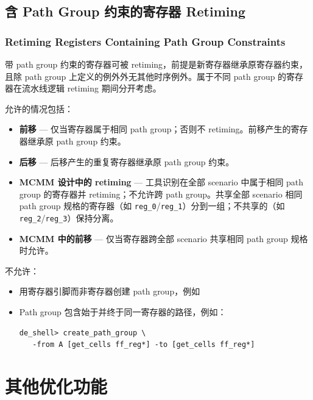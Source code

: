 
\subsection{含 Path Group 约束的寄存器 Retiming}
\subsubsection*{Retiming Registers Containing Path Group Constraints}

带 path group 约束的寄存器可被 retiming，前提是新寄存器继承原寄存器约束，且除 path group 上定义的例外外无其他时序例外。属于不同 path group 的寄存器在流水线逻辑 retiming 期间分开考虑。

允许的情况包括：
\begin{itemize}
  \item \textbf{前移} — 仅当寄存器属于相同 path group；否则不 retiming。前移产生的寄存器继承原 path group 约束。
  \item \textbf{后移} — 后移产生的重复寄存器继承原 path group 约束。
  \item \textbf{MCMM 设计中的 retiming} — 工具识别在全部 scenario 中属于相同 path group 的寄存器并 retiming；不允许跨 path group。共享全部 scenario 相同 path group 规格的寄存器（如 \texttt{reg\_0}/\texttt{reg\_1}）分到一组；不共享的（如 \texttt{reg\_2}/\texttt{reg\_3}）保持分离。
  \item \textbf{MCMM 中的前移} — 仅当寄存器跨全部 scenario 共享相同 path group 规格时允许。
\end{itemize}

不允许：
\begin{itemize}
  \item 用寄存器引脚而非寄存器创建 path group，例如 
  \item Path group 包含始于并终于同一寄存器的路径，例如：
\begin{lstlisting}
de_shell> create_path_group \
   -from A [get_cells ff_reg*] -to [get_cells ff_reg*]
\end{lstlisting}
\end{itemize}

\section{其他优化功能}
